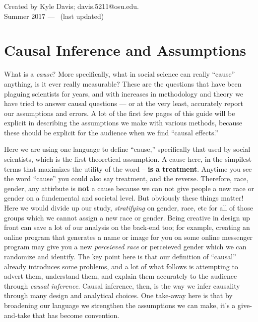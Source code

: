 \documentclass[12pt]{article}\usepackage[]{graphicx}\usepackage[]{color}
\begin{document}
\begin{flushleft}
\begin{center}
Created by Kyle Davis; davis.5211@osu.edu.\\ Summer 2017 --- \thedate ~(last updated)
\end{center}




\clearpage
\thispagestyle{empty}


\clearpage
\tableofcontents
\thispagestyle{empty}




\clearpage
\setcounter{page}{1}

\section{Causal Inference and Assumptions}

What is a \textit{cause}? More specifically, what in social science can really ``cause'' anything, is it ever really measurable? These are the questions that have been plaguing scientists for years, and with increases in methodology and theory we have tried to answer causal questions --- or at the very least, accurately report our assumptions and errors. A lot of the first few pages of this guide will be explicit in describing the assumptions we make with various methods, because these should be explicit for the audience when we find ``causal effects.''

Here we are using one language to define ``cause,'' specifically that used by social scientists, which is the first theoretical assumption. A cause here, in the simpilest terms that maximizes the utility of the word -- \textbf{is a treatment}. Anytime you see the word ``cause'' you could also say treatment, and the reverse. Therefore, race, gender, any attirbute is \textbf{not} a cause because we can not give people a new race or gender on a fundemental and societal level. But obviously these things matter! Here we would divide up our study, \textit{stratifying} on gender, race, etc for all of those groups which we cannot assign a new race or gender. Being creative in design up front can save a lot of our analysis on the back-end too; for example, creating an online program that generates a name or image for you on some online messenger program may give you a new \textit{perceieved race} or {perceieved gender} which we can randomize and identify. The key point here is that our definition of ``causal'' already introduces some problems, and a lot of what follows is attempting to advert them, understand them, and explain them accurately to the audience through \textit{causal inference}. Causal inference, then, is the way we infer causality through many design and analytical choices. One take-away here is that by broadening our language we strengthen the assumptions we can make, it's a give-and-take that has become convention. 


\end{flushleft}
\end{document}
